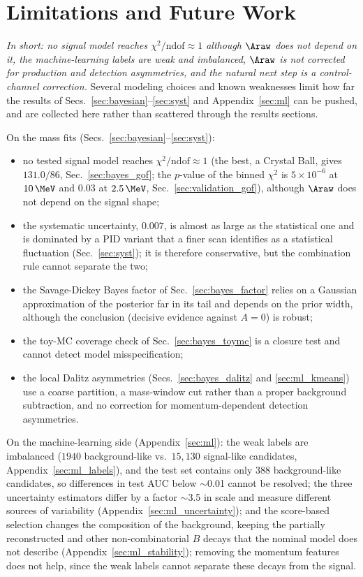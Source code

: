 \section{Limitations and Future Work}
\label{sec:limitations}
\emph{In short: no signal model reaches $\chi^2/\mathrm{ndof}\approx1$ although $\Araw$ does not depend on it, the machine-learning labels are weak and imbalanced, $\Araw$ is not corrected for production and detection asymmetries, and the natural next step is a control-channel correction.}
Several modeling choices and known weaknesses limit how far the results of Secs.~\ref{sec:bayesian}--\ref{sec:syst} and Appendix~\ref{sec:ml} can be pushed, and are collected here rather than scattered through the results sections.

On the mass fits (Secs.~\ref{sec:bayesian}--\ref{sec:syst}):
\begin{itemize}[leftmargin=*,itemsep=2pt]
\item no tested signal model reaches $\chi^2/\mathrm{ndof}\approx1$ (the best, a Crystal Ball, gives $131.0/86$, Sec.~\ref{sec:bayes_gof}; the $p$-value of the binned $\chi^2$ is $5\times10^{-6}$ at $10\,\MeV$ and $0.03$ at $2.5\,\MeV$, Sec.~\ref{sec:validation_gof}), although $\Araw$ does not depend on the signal shape;
\item the systematic uncertainty, $0.007$, is almost as large as the statistical one and is dominated by a PID variant that a finer scan identifies as a statistical fluctuation (Sec.~\ref{sec:syst}); it is therefore conservative, but the combination rule cannot separate the two;
\item the Savage-Dickey Bayes factor of Sec.~\ref{sec:bayes_factor} relies on a Gaussian approximation of the posterior far in its tail and depends on the prior width, although the conclusion (decisive evidence against $A=0$) is robust;
\item the toy-MC coverage check of Sec.~\ref{sec:bayes_toymc} is a closure test and cannot detect model misspecification;
\item the local Dalitz asymmetries (Secs.~\ref{sec:bayes_dalitz} and \ref{sec:ml_kmeans}) use a coarse partition, a mass-window cut rather than a proper background subtraction, and no correction for momentum-dependent detection asymmetries.
\end{itemize}

On the machine-learning side (Appendix~\ref{sec:ml}): the weak labels are imbalanced ($1940$ background-like vs.\ $15{,}130$ signal-like candidates, Appendix~\ref{sec:ml_labels}), and the test set contains only $388$ background-like candidates, so differences in test AUC below $\sim$0.01 cannot be resolved; the three uncertainty estimators differ by a factor $\sim$3.5 in scale and measure different sources of variability (Appendix~\ref{sec:ml_uncertainty}); and the score-based selection changes the composition of the background, keeping the partially reconstructed and other non-combinatorial $B$ decays that the nominal model does not describe (Appendix~\ref{sec:ml_stability}); removing the momentum features does not help, since the weak labels cannot separate these decays from the signal.


